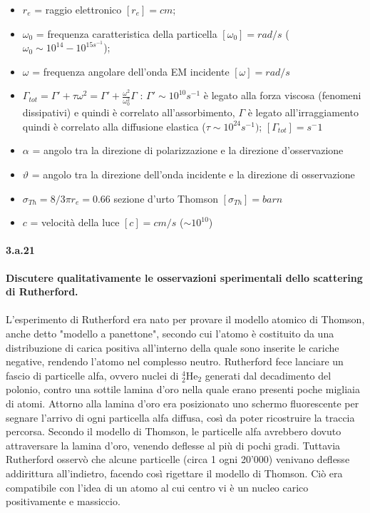 \documentclass[twoside]{article}
\begin{document}
\begin{itemize}
    \item $r_e$ = raggio elettronico $[r_e]=cm$; \\
    \item $\omega_0$ = frequenza caratteristica della particella $[\omega_0]=rad/s$ ($\omega_0\sim 10^{14}-10^{15 s^{-1}}$);
    \item $\omega$ = frequenza angolare dell'onda EM incidente $[\omega]=rad/s$
    \item $\Gamma_{tot}=\Gamma'+\tau\omega^2=\Gamma'+\frac{\omega^2}{\omega_0^2}\Gamma$ : $\Gamma'\sim 10^{10}s^{-1}$ è legato alla forza viscosa (fenomeni dissipativi) e quindi è correlato all'assorbimento, $\Gamma$ è legato  all'irraggiamento quindi è correlato alla diffusione elastica ($\tau\sim 10^24 s^{-1})$;  $[\Gamma_{tot}]=s^-1$ 
    \item $\alpha$ = angolo tra la direzione di polarizzazione e la direzione d'osservazione
    \item $\vartheta$ = angolo tra la direzione dell'onda incidente e la direzione di osservazione
    \item $\sigma_{Th}= 8/3\pi r_e=0.66$ sezione d'urto Thomson $[\sigma_{Th}]=barn$
    \item $c$ = velocità della luce $[c]=cm/s$ ($\sim 10^{10}$)
\end{itemize}


\paragraph{3.a.21}\textbf{Discutere qualitativamente le osservazioni sperimentali dello scattering di Rutherford.}\\
\\
L'esperimento di Rutherford era nato per provare il modello atomico di Thomson, anche detto "modello a panettone", secondo cui l'atomo è costituito da una distribuzione di carica positiva all'interno della quale sono inserite le cariche negative, rendendo l'atomo nel complesso neutro. Rutherford fece lanciare un fascio di particelle alfa, ovvero nuclei di ${}^{4}_2$He$_2$ generati dal decadimento del polonio, contro una sottile lamina d'oro nella quale erano presenti poche migliaia di atomi. Attorno alla lamina d'oro era posizionato uno schermo fluorescente per segnare l'arrivo di ogni particella alfa diffusa, così da poter ricostruire la traccia percorsa. Secondo il modello di Thomson, le particelle alfa avrebbero dovuto attraversare la lamina d'oro, venendo deflesse al più di pochi gradi. Tuttavia Rutherford osservò che alcune particelle (circa 1 ogni 20'000) venivano deflesse addirittura all'indietro, facendo così rigettare il modello di Thomson. Ciò era compatibile con l'idea di un atomo al cui centro vi è un nucleo carico positivamente e massiccio.
\end{document}
